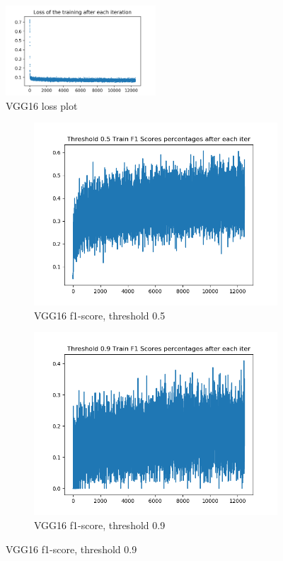 \begin{figure}[!ht]
\centering
\includegraphics[width=0.5\textwidth]{vgg16-full-lazy-1-train-loss.png}
\caption{\label{vgg16:vgg16-full-train-loss}VGG16 loss plot}
\end{figure}

\begin{figure}[!ht]
\centering
\begin{subfigure}{.5\textwidth}
	\centering
	\includegraphics[width=1\linewidth]{vgg16-full-lazy-1-train-scores-f1-5.png}
	\caption{\label{vgg16:vgg16-full-lazy-1-train-scores-f1-5}VGG16 f1-score, threshold 0.5}
\end{subfigure}%
\begin{subfigure}{.5\textwidth}
	\centering
	\includegraphics[width=1\linewidth]{vgg16-full-lazy-1-train-scores-f1-9.png}
	\caption{\label{vgg16:vgg16-full-lazy-1-train-scores-f1-9}VGG16 f1-score, threshold 0.9}
\end{subfigure}
\end{figure}

